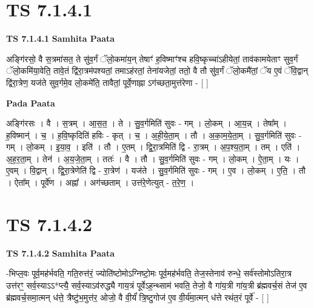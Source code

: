 \documentclass[17pt]{extarticle}
\begin{document}
\section{ TS 7.1.4.1 }

\textbf{TS 7.1.4.1 } \newline
\textbf{Samhita Paata} \newline

अङ्गि॑रसो॒ वै स॒त्रमा॑सत॒ ते सु॑व॒र्गं ॅलो॒कमा॑य॒न् तेषाꣳ॑ ह॒विष्माꣳ॑श्च हवि॒ष्कृच्चा॑ऽहीयेतां॒ ताव॑कामयेताꣳ सुव॒र्गं ॅलो॒कमि॑या॒वेति॒ तावे॒तं द्वि॑रा॒त्रम॑पश्यतां॒ तमाऽह॑रतां॒ तेना॑यजेतां॒ ततो॒ वै तौ सु॑व॒र्गं ॅलो॒कमै॑तां॒ ॅय ए॒वं ॅवि॒द्वान् द्वि॑रा॒त्रेण॒ यज॑ते सुव॒र्गमे॒व लो॒कमे॑ति॒ तावैतां॒ पूर्वे॒णाह्ना ऽग॑च्छता॒मुत्त॑रेणा - [  ] \newline

\textbf{Pada Paata} \newline

अङ्गि॑रसः । वै । स॒त्रम् । आ॒स॒त॒ । ते । सु॒व॒र्गमिति॑ सुवः - गम् । लो॒कम् । आ॒य॒न्न् । तेषा᳚म् । ह॒विष्मान्॑ । च॒ । ह॒वि॒ष्कृदिति॑ हविः - कृत् । च॒ । अ॒ही॒ये॒ता॒म् । तौ । अ॒का॒म॒ये॒ता॒म् । सु॒व॒र्गमिति॑ सुवः - गम् । लो॒कम् । इ॒या॒व॒ । इति॑ । तौ । ए॒तम् । द्वि॒रा॒त्रमिति॑ द्वि - रा॒त्रम् । अ॒प॒श्य॒ता॒म् । तम् । एति॑ । अ॒ह॒र॒ता॒म् । तेन॑ । अ॒य॒जे॒ता॒म् । ततः॑ । वै । तौ । सु॒व॒र्गमिति॑ सुवः - गम् । लो॒कम् । ऐ॒ता॒म् । यः । ए॒वम् । वि॒द्वान् । द्वि॒रा॒त्रेणेति॑ द्वि - रा॒त्रेण॑ । यज॑ते । सु॒व॒र्गमिति॑ सुवः - गम् । ए॒व । लो॒कम् । ए॒ति॒ । तौ । ऐता᳚म् । पूर्वे॑ण । अह्ना᳚ । अग॑च्छताम् । उत्त॑रे॒णेत्युत् - त॒रे॒ण॒ ।  \newline





\section{ TS 7.1.4.2 }

\textbf{TS 7.1.4.2 } \newline
\textbf{Samhita Paata} \newline

-भिप्ल॒वः पूर्व॒मह॑र्भवति॒ गति॒रुत्त॑रं॒ ज्योति॑ष्टोमोऽग्निष्टो॒मः पूर्व॒मह॑र्भवति॒ तेज॒स्तेनाव॑ रुन्धे॒ सर्व॑स्तोमोऽतिरा॒त्र उत्त॑रꣳ॒॒ सर्व॒स्याऽऽ*प्त्यै॒ सर्व॒स्याऽव॑रुद्ध्यै गाय॒त्रं पूर्वेऽह॒न्थ्साम॑ भवति॒ तेजो॒ वै गा॑य॒त्री गा॑य॒त्री ब्र॑ह्मवर्च॒सं तेज॑ ए॒व ब्र॑ह्मवर्च॒समा॒त्मन् ध॑त्ते॒ त्रैष्टु॑भ॒मुत्त॑र॒ ओजो॒ वै वी॒र्यं॑ त्रि॒ष्टुगोज॑ ए॒व वी॒र्य॑मा॒त्मन् ध॑त्ते रथंत॒रं पूर्वे॑ - [  ] \newline
\end{document}
